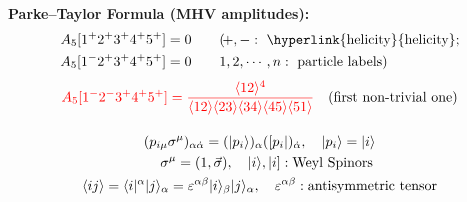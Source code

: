 \documentclass{beamer}
\newcommand{\aket}[1]{|#1\rangle}
\newcommand{\sket}[1]{|#1]}
\newcommand{\avg}[1]{\langle #1 \rangle}
\begin{document}
\begin{frame}
    \qquad \textbf{Parke–Taylor Formula (MHV amplitudes):}
    \begin{align*}
    A_5[1^+2^+3^+4^+5^+] &= 0 
    \qquad (\!+,-:~\text{\hyperlink{helicity}{helicity};} \\
    A_5[1^-2^+3^+4^+5^+] &= 0 
    \qquad 1,2,\cdots,n:~\text{particle labels}) \\
    \end{align*}
    \vspace{-3em}
    \hypertarget{conv}{}
    \begin{gather*}
    \textcolor{red}{A_5[1^-2^-3^+4^+5^+]= 
    \frac{\langle 1 2 \rangle^4}
         {\langle 1 2 \rangle \langle 2 3 \rangle \langle 3 4 \rangle \langle45 \rangle \langle 5 1 \rangle}}\quad (\text{first non-trivial one})\\[1em]
    (p_{i\mu} \sigma^\mu)_{\alpha\dot{\alpha}}=(\aket{p_i})_\alpha([p_i|)_{\dot{\alpha}},\quad \aket{p_i}=\aket{i}\\
    \quad \sigma^\mu=(1,\vec{\sigma}),\quad \aket{i},\sket{i}: \text{Weyl Spinors}\\
    \avg{ij}=\langle i |^\alpha \aket{j}_\alpha=\varepsilon^{\alpha\beta}\aket{i}_\beta\aket{j}_\alpha,\quad \varepsilon^{\alpha\beta}: \text{antisymmetric tensor}
    \end{gather*}
\end{frame}
\end{document}

